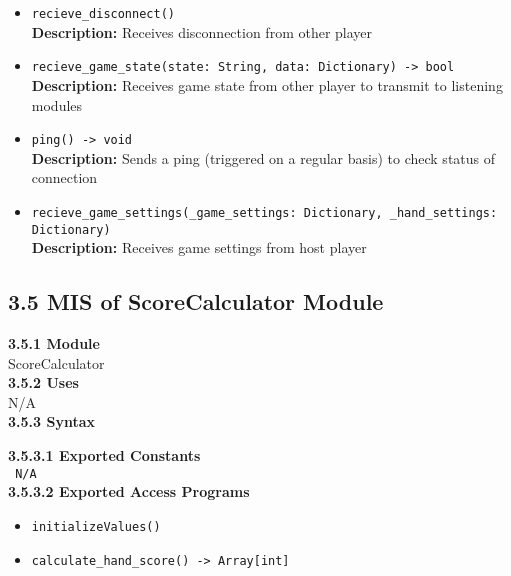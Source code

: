 \documentclass[12pt, titlepage]{article}
\begin{document}
\begin{itemize}
    \item \texttt{recieve\_disconnect()}\\
    \textbf{Description:} Receives disconnection from other player
    
    \item \texttt{recieve\_game\_state(state: String, data: Dictionary) -> bool}\\
    \textbf{Description:} Receives game state from other player to transmit to listening modules
    
    \item \texttt{ping() -> void}\\
    \textbf{Description:} Sends a ping (triggered on a regular basis) to check status of connection
    
    \item \texttt{recieve\_game\_settings(\_game\_settings: Dictionary, \_hand\_settings: Dictionary)}\\
    \textbf{Description:} Receives game settings from host player
\end{itemize}


\subsection*{3.5 MIS of ScoreCalculator Module}
\textbf{3.5.1 Module}\\
 ScoreCalculator\\

\noindent \textbf{3.5.2 Uses}\\
N/A \\

\noindent \textbf{3.5.3 Syntax}

\noindent \textbf{3.5.3.1 Exported Constants}\\

\texttt{ N/A}\\

\textbf{3.5.3.2 Exported Access Programs}
\begin{itemize}
	\item \texttt{initializeValues()}
	\item \texttt{calculate\_hand\_score() -> Array[int]}
	
\end{itemize}
\end{document}
